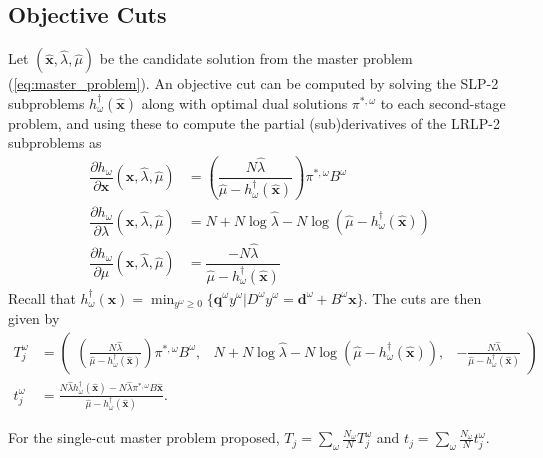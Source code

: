 \documentclass[11pt]{article}
\newcommand{\x}{\mathbf{x}}
\newcommand{\xh}{\hat{\x}}
\newcommand{\lh}{\hat{\lambda}}
\newcommand{\mh}{\hat{\mu}}
\newcommand{\q}{\mathbf{q}}
\renewcommand{\d}{\mathbf{d}}
\begin{document}
\subsection{Objective Cuts}

Let $(\xh,\lh,\mh)$ be the candidate solution from the master problem (\ref{eq:master_problem}).
An objective cut can be computed by solving the SLP-2 subproblems $h^\dagger_\omega(\xh)$ along with optimal dual solutions $\pi^{*,\omega}$ to each second-stage problem, and using these to compute the partial (sub)derivatives of the LRLP-2 subproblems as
\begin{align*}
	\dfrac{\partial h_\omega}{\partial \x}(\xh,\lh,\mh) & = \left(\dfrac{N\lh}{\mh - h^\dagger_\omega(\xh)}\right) \pi^{*,\omega} B^\omega \\
	\dfrac{\partial h_\omega}{\partial \lambda}(\xh,\lh,\mh) & = N + N\log\lh - N \log(\mh - h^\dagger_\omega(\xh)) \\
	\dfrac{\partial h_\omega}{\partial \mu}(\xh,\lh,\mh) & = \dfrac{-N\lh}{\mh - h^\dagger_\omega(\xh)}
\end{align*}
Recall that $h^\dagger_\omega(\x) = \min_{y^\omega \geq 0} \{\q^\omega y^\omega | D^\omega y^\omega = \d^\omega + B^\omega \x\}$.
The cuts are then given by
\begin{align*}
	T_j^\omega & = 
	\left( \begin{array}{ccc}
		\left(\frac{N\lh}{\mh - h^\dagger_\omega(\xh)}\right) \pi^{*,\omega} B^\omega, 
			 & N + N\log\lh - N\log(\mh - h^\dagger_\omega(\xh)), 
			 & -\frac{N\lh}{\mh - h^\dagger_\omega(\xh)}
	\end{array} \right) \\
	t_j^\omega & = \frac{N \lh h^\dagger_\omega(\xh) - N \lh \pi^{*,\omega}B\xh}{\mh - h^\dagger_\omega(\xh)}.
\end{align*}

For the single-cut master problem proposed, $T_j = \sum_\omega \frac{N_\omega}{N} T_j^\omega$ and $t_j = \sum_\omega \frac{N_\omega}{N} t_j^\omega$.
\end{document}

